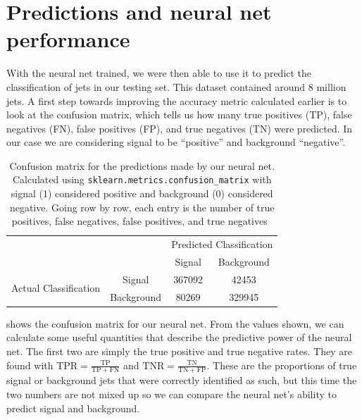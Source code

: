\documentclass[11pt]{article}
\numberwithin{equation}{section}
\numberwithin{figure}{section}
\numberwithin{table}{section}
\begin{document}
\section{Predictions and neural net performance}\label{sec:Predictions}
With the neural net trained, we were then able to use it to predict the classification of jets in our testing set. This dataset contained around 8 million jets. A first step towards improving the accuracy metric calculated earlier is to look at the confusion matrix, which tells us how many true positives (TP), false negatives (FN), false positives (FP), and true negatives (TN) were predicted. In our case we are considering signal to be ``positive'' and background ``negative''.

\begin{table}[h]
    \centering
    \begin{tabular}{cccc}
        \multicolumn{2}{c}{\multirow{2}{*}{}} & \multicolumn{2}{c}{Predicted Classification} \\ \cmidrule{3-4}
        \multicolumn{2}{c}{} & Signal & Background \\ \cmidrule(lr){3-3} \cmidrule(lr){4-4}
        \multirow{2}{*}{Actual Classification} & Signal & 367092 & 42453 \\ \cmidrule(lr){2-2}
        & Background & 80269 & 329945 \\ \cmidrule(lr){2-2}
    \end{tabular}
    \caption{Confusion matrix for the predictions made by our neural net. Calculated using \texttt{sklearn.metrics.confusion\_matrix} with signal (1) considered positive and background (0) considered negative. Going row by row, each entry is the number of true positives, false negatives, false positives, and true negatives~\cite{Confusion_Matrix}}
    \label{tbl:conf_matrix}
\end{table}

 shows the confusion matrix for our neural net. From the values shown, we can calculate some useful quantities that describe the predictive power of the neural net. The first two are simply the true positive and true negative rates. They are found with $\mathrm{TPR}=\frac{\mathrm{TP}}{\mathrm{TP}+\mathrm{FN}}$ and $\mathrm{TNR}=\frac{\mathrm{TN}}{\mathrm{TN}+\mathrm{FP}}$. These are the proportions of true signal or background jets that were correctly identified as such, but this time the two numbers are not mixed up so we can compare the neural net's ability to predict signal and background.
\end{document}
